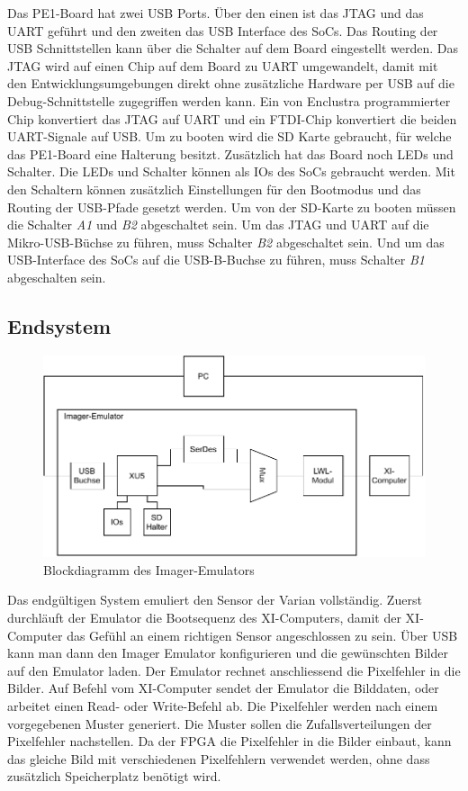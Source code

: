 \documentclass{article}
\begin{document}
Das PE1-Board hat zwei USB Ports. Über den einen ist das JTAG und das UART geführt und den zweiten das USB Interface des SoCs. Das Routing der USB Schnittstellen kann über die Schalter auf dem Board eingestellt werden. Das JTAG wird auf einen Chip auf dem Board zu UART umgewandelt, damit mit den Entwicklungsumgebungen direkt ohne zusätzliche Hardware per USB auf die Debug-Schnittstelle zugegriffen werden kann. Ein von Enclustra programmierter Chip konvertiert das JTAG auf UART und ein FTDI-Chip konvertiert die beiden UART-Signale auf USB. Um zu booten wird die SD Karte gebraucht, für welche das PE1-Board eine Halterung besitzt. Zusätzlich hat das Board noch LEDs und Schalter. Die LEDs und Schalter können als IOs des SoCs gebraucht werden. Mit den Schaltern können zusätzlich Einstellungen für den Bootmodus und das Routing der USB-Pfade gesetzt werden. Um von der SD-Karte zu booten müssen die Schalter \textit{A1} und \textit{B2} abgeschaltet sein. Um das JTAG und UART auf die Mikro-USB-Büchse zu führen, muss Schalter \textit{B2} abgeschaltet sein. Und um das USB-Interface des SoCs auf die USB-B-Buchse zu führen, muss Schalter \textit{B1} abgeschalten sein. 


\subsection{Endsystem}
\begin{figure}[tb]
    \includegraphics[width=\linewidth]{drawio/bd_top}
    \caption{Blockdiagramm des Imager-Emulators}
    \label{fig:bd_top}
\end{figure}

Das endgültigen System emuliert den Sensor der Varian vollständig. Zuerst durchläuft der Emulator die Bootsequenz des XI-Computers, damit der XI-Computer das Gefühl an einem richtigen Sensor angeschlossen zu sein. Über USB kann man dann den Imager Emulator konfigurieren und die gewünschten Bilder auf den Emulator laden. Der Emulator rechnet anschliessend die Pixelfehler in die Bilder. Auf Befehl vom XI-Computer sendet der Emulator die Bilddaten, oder arbeitet einen Read- oder Write-Befehl ab. Die Pixelfehler werden nach einem vorgegebenen Muster generiert. Die Muster sollen die Zufallsverteilungen der Pixelfehler nachstellen. Da der FPGA die Pixelfehler in die Bilder einbaut, kann das gleiche Bild mit verschiedenen Pixelfehlern verwendet werden, ohne dass zusätzlich Speicherplatz benötigt wird.
\end{document}

